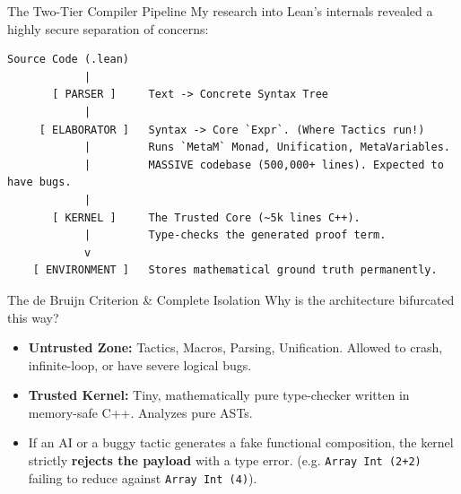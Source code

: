 \documentclass[aspectratio=169, 10pt]{beamer}
\begin{document}
\begin{frame}[fragile]{The Two-Tier Compiler Pipeline}
    My research into Lean's internals revealed a highly secure separation of concerns:
    
    \begin{center}
    \begin{minipage}{0.85\linewidth}
\begin{lstlisting}[basicstyle=\ttfamily\scriptsize]
     Source Code (.lean)
            |
       [ PARSER ]     Text -> Concrete Syntax Tree
            |
     [ ELABORATOR ]   Syntax -> Core `Expr`. (Where Tactics run!)
            |         Runs `MetaM` Monad, Unification, MetaVariables.
            |         MASSIVE codebase (500,000+ lines). Expected to have bugs.
            |
       [ KERNEL ]     The Trusted Core (~5k lines C++).
            |         Type-checks the generated proof term.
            v
    [ ENVIRONMENT ]   Stores mathematical ground truth permanently.
\end{lstlisting}
    \end{minipage}
    \end{center}
\end{frame}

\begin{frame}{The de Bruijn Criterion \& Complete Isolation}
    Why is the architecture bifurcated this way?
    
    \vspace{1em}
    \begin{itemize}
        \item \textbf{Untrusted Zone:} Tactics, Macros, Parsing, Unification. Allowed to crash, infinite-loop, or have severe logical bugs.
        \item \textbf{Trusted Kernel:} Tiny, mathematically pure type-checker written in memory-safe C++. Analyzes pure ASTs.
        \item If an AI or a buggy tactic generates a fake functional composition, the kernel strictly \textbf{rejects the payload} with a type error. (e.g. \texttt{Array Int (2+2)} failing to reduce against \texttt{Array Int (4)}).
    \end{itemize}
\end{frame}
\end{document}
